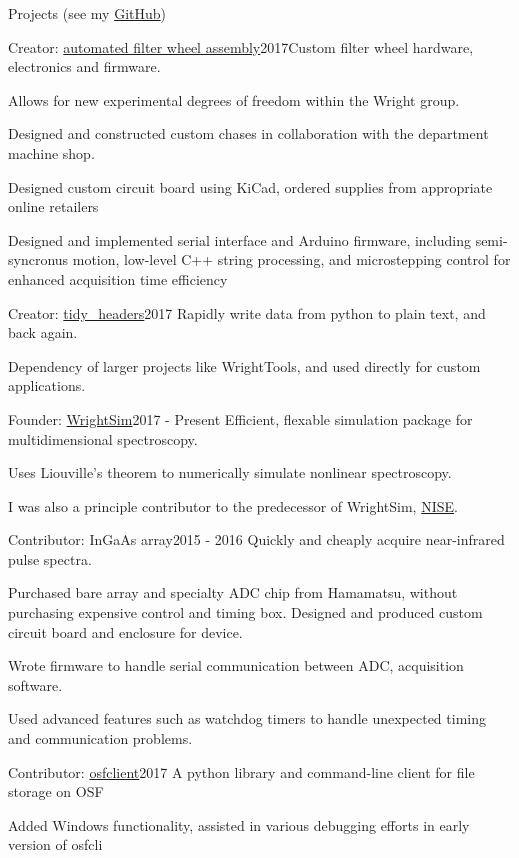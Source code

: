 \documentclass{resume}  %
\begin{document}
\begin{rSection}{Projects (see my \href{https://github.com/untzag}{GitHub})}
\begin{rSubsection}{Creator: \href{https://github.com/wright-group/FilterWheels}{automated filter
        wheel assembly}}{2017}{Custom filter wheel hardware, electronics and firmware.}{}
    \item Allows for new experimental degrees of freedom within the Wright group.
    \item Designed and constructed custom chases in collaboration with the department machine shop.
    \item Designed custom circuit board using KiCad, ordered supplies from appropriate online
      retailers
    \item Designed and implemented serial interface and Arduino firmware, including semi-syncronus
      motion, low-level C++ string processing, and microstepping control for enhanced acquisition
      time efficiency
  \end{rSubsection}
  \begin{rSubsection}{Creator: \href{https://github.com/untzag/tidy_headers}{tidy\_headers}}{2017}
    {Rapidly write data from python to plain text, and back again.}{}
    \item Dependency of larger projects like WrightTools, and used directly for custom
      applications.
  \end{rSubsection}
  \begin{rSubsection}{Founder: \href{https://github.com/wright-group/WrightSim}{WrightSim}}{2017 -
      Present}
    {Efficient, flexable simulation package for multidimensional spectroscopy.}{}
    \item Uses Liouville's theorem to numerically simulate nonlinear spectroscopy.
    \item I was also a principle contributor to the predecessor of WrightSim,
      \href{https://github.com/wright-group/NISE}{NISE}.
  \end{rSubsection}
  \begin{rSubsection}{Contributor: InGaAs array}{2015 - 2016}
    {Quickly and cheaply acquire near-infrared pulse spectra.}{}
    \item Purchased bare array and specialty ADC chip from Hamamatsu, without purchasing expensive
      control and timing box. Designed and produced custom circuit board and enclosure for device.
    \item Wrote firmware to handle serial communication between ADC, acquisition software.
    \item Used advanced features such as watchdog timers to handle unexpected timing and
      communication problems.
  \end{rSubsection}
  \begin{rSubsection}{Contributor: \href{https://github.com/dib-lab/osf-cli}{osfclient}}{2017}
    {A python library and command-line client for file storage on OSF}{}
    \item Added Windows functionality, assisted in various debugging efforts in early version of
      osfcli
  \end{rSubsection}
\end{rSection}
\end{document}

